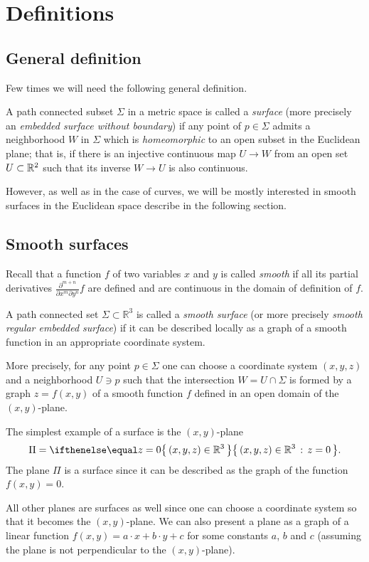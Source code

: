 \chapter{Definitions}

\section*{General definition}

Few times we will need the following general definition.

A path connected subset $\Sigma$ in a metric space is called a \emph{surface} (more precisely an \emph{embedded surface without boundary}) 
if any point of $p\in \Sigma$ admits a neighborhood $W$ in $\Sigma$ which is \emph{homeomorphic} to an open subset in the Euclidean plane;
that is, if there is an injective continuous map $U\to W$ from an open set $U\subset \mathbb{R}^2$ such that its inverse $W\to U$ is also continuous.

However, as well as in the case of curves, we will be mostly interested in smooth surfaces in the Euclidean space describe in the following section.

\section*{Smooth surfaces}

Recall that a function $f$ of two variables $x$ and $y$ is called \emph{smooth} if all its partial derivatives $\frac{\partial^{m+n}}{\partial x^m\partial y^n}f$ are defined and are continuous in the domain of definition of $f$. 

A path connected set $\Sigma \subset \mathbb{R}^3$ is called a \emph{smooth surface} (or more precisely \emph{smooth regular embedded surface}) if it can be described locally as a graph of a smooth function in an appropriate coordinate system.\label{page:def-smooth-surface}

More precisely, for any point $p\in \Sigma$ one can choose a coordinate system $(x,y,z)$ and a neighborhood $U\ni p$ such that
the intersection $W=U\cap \Sigma$ is formed by a graph $z=f(x,y)$ of a smooth function $f$ defined in an open domain of the $(x,y)$-plane.

The simplest example of a surface is the $(x,y)$-plane 
\[\Pi=\set{(x,y,z)\in\RR^3}{z=0}.\]
The plane $\Pi$ is a surface since
it can be described as the graph of the function $f(x,y)=0$.

All other planes are surfaces as well since one can choose a coordinate system so that it becomes the $(x,y)$-plane.
We can also present a plane as a graph of a linear function 
$f(x,y)=a\cdot x+b\cdot y+c$ for some constants $a$, $b$ and $c$
(assuming the plane is not perpendicular to the $(x,y)$-plane).

